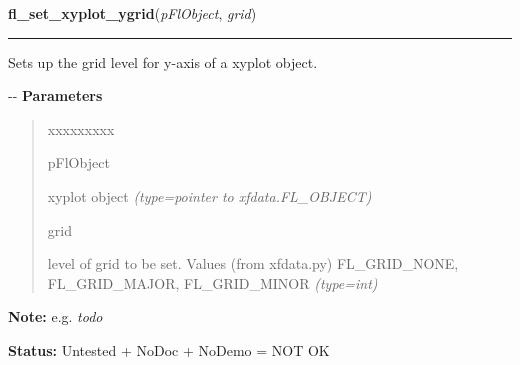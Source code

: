 \hspace{.8\funcindent}\begin{boxedminipage}{\funcwidth}

    \raggedright \textbf{fl\_set\_xyplot\_ygrid}(\textit{pFlObject}, \textit{grid})

    \vspace{-1.5ex}

    \rule{\textwidth}{0.5\fboxrule}
\setlength{\parskip}{2ex}

Sets up the grid level for y-axis of a xyplot object.

-{}-
\setlength{\parskip}{1ex}
      \textbf{Parameters}
      \vspace{-1ex}

      \begin{quote}
        \begin{Ventry}{xxxxxxxxx}

          \item[pFlObject]


xyplot object
            {\it (type=pointer to xfdata.FL\_OBJECT)}

          \item[grid]


level of grid to be set. Values (from xfdata.py) FL\_GRID\_NONE,
FL\_GRID\_MAJOR, FL\_GRID\_MINOR
            {\it (type=int)}

        \end{Ventry}

      \end{quote}

\textbf{Note:} 
e.g. \emph{todo}


\textbf{Status:} 
Untested + NoDoc + NoDemo = NOT OK


    \end{boxedminipage}

    \label{xformslib:flxyplot:fl_set_xyplot_grid_linestyle}

    \vspace{0.5ex}

